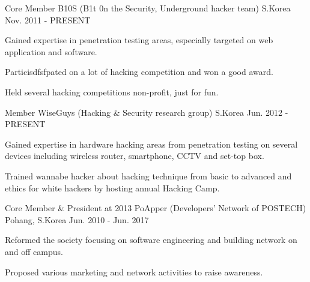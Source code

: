 

\begin{cventries}

  \cventry
    {Core Member} %
    {B10S (B1t 0n the Security, Underground hacker team)} %
    {S.Korea} %
    {Nov. 2011 - PRESENT} %
    {
      \begin{cvitems} %
        \item {Gained expertise in penetration testing areas, especially targeted on web application and software.}
        \item {Particisdfsfpated on a lot of hacking competition and won a good award.}
        \item {Held several hacking competitions non-profit, just for fun.}
      \end{cvitems}
    }

  \cventry
    {Member} %
    {WiseGuys (Hacking \& Security research group)} %
    {S.Korea} %
    {Jun. 2012 - PRESENT} %
    {
      \begin{cvitems} %
        \item {Gained expertise in hardware hacking areas from penetration testing on several devices including wireless router, smartphone, CCTV and set-top box.}
        \item {Trained wannabe hacker about hacking technique from basic to advanced and ethics for white hackers by hosting annual Hacking Camp.}
      \end{cvitems}
    }

  \cventry
    {Core Member \& President at 2013} %
    {PoApper (Developers' Network of POSTECH)} %
    {Pohang, S.Korea} %
    {Jun. 2010 - Jun. 2017} %
    {
      \begin{cvitems} %
        \item {Reformed the society focusing on software engineering and building network on and off campus.}
        \item {Proposed various marketing and network activities to raise awareness.}
      \end{cvitems}
    }


\end{cventries}

